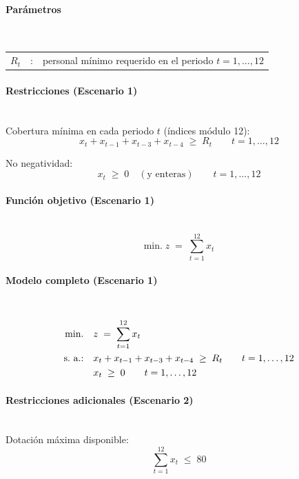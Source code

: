 \paragraph{Parámetros}\mbox{}\\
\begin{tabular}{l c l}
    $R_t$  & : & personal mínimo requerido en el periodo $t=1,\dots,12$\\
\end{tabular}

\paragraph{Restricciones (Escenario 1)}\mbox{}\\
Cobertura mínima en cada periodo $t$ (índices módulo 12):
\begin{equation}
    x_t + x_{t-1} + x_{t-3} + x_{t-4} \;\geq\; R_t \qquad t=1,\dots,12
\end{equation}

\noindent No negatividad:
\begin{equation}
    x_t \;\geq\; 0 \quad (\text{y enteras}) \qquad t=1,\dots,12
\end{equation}

\paragraph{Función objetivo (Escenario 1)}\mbox{}\\
\begin{equation}
\mbox{min.}\; z \;=\; \sum_{t=1}^{12} x_t
\end{equation}

\paragraph{Modelo completo (Escenario 1)}\mbox{}\\
\begin{align}
\mbox{min.}\quad & z \;=\; \sum_{t=1}^{12} x_t \notag \\
\mbox{s.\ a.:}\quad 
& x_t + x_{t-1} + x_{t-3} + x_{t-4} \;\geq\; R_t \qquad t=1,\dots,12 \notag \\
& x_t \;\geq\; 0 \qquad t=1,\dots,12 \notag
\end{align}

\paragraph{Restricciones adicionales (Escenario 2)}\mbox{}\\
Dotación máxima disponible:
\begin{equation}
    \sum_{t=1}^{12} x_t \;\leq\; 80
\end{equation}

